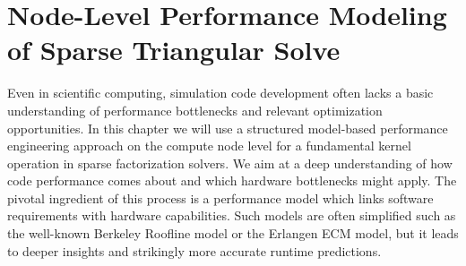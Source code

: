 \chapter{Node-Level Performance Modeling of Sparse Triangular Solve}
\label{c:modeling}

Even in scientific computing, simulation code development often lacks a basic understanding of performance bottlenecks and relevant optimization opportunities. In this chapter we will use a structured model-based performance engineering approach on the compute node level for a fundamental kernel operation in sparse factorization solvers. We aim at a deep understanding of how code performance comes about and which hardware bottlenecks might apply. The pivotal ingredient of this process is a performance model which links software requirements with hardware capabilities. Such models are often simplified such as the well-known Berkeley Roofline model or the Erlangen ECM model, but it leads to deeper insights and strikingly more accurate runtime predictions.

